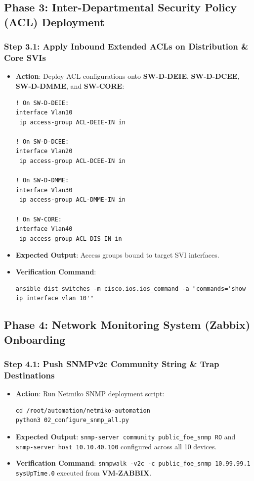 \documentclass[11pt,a4paper]{article}
\newcommand{\hr}{\vspace{0.2cm}\noindent\hrulefill\vspace{0.2cm}}
\begin{document}
\subsection{Phase 3: Inter-Departmental Security Policy (ACL) Deployment}

\subsubsection{Step 3.1: Apply Inbound Extended ACLs on Distribution \& Core SVIs}
\begin{itemize}
    \item \textbf{Action}: Deploy ACL configurations onto \textbf{SW-D-DEIE}, \textbf{SW-D-DCEE}, \textbf{SW-D-DMME}, and \textbf{SW-CORE}:
\begin{lstlisting}[style=ciscostyle]
! On SW-D-DEIE:
interface Vlan10
 ip access-group ACL-DEIE-IN in

! On SW-D-DCEE:
interface Vlan20
 ip access-group ACL-DCEE-IN in

! On SW-D-DMME:
interface Vlan30
 ip access-group ACL-DMME-IN in

! On SW-CORE:
interface Vlan40
 ip access-group ACL-DIS-IN in
\end{lstlisting}
    \item \textbf{Expected Output}: Access groups bound to target SVI interfaces.
    \item \textbf{Verification Command}:
\begin{lstlisting}[style=bashstyle]
ansible dist_switches -m cisco.ios.ios_command -a "commands='show ip interface vlan 10'"
\end{lstlisting}
\end{itemize}

\hr

\subsection{Phase 4: Network Monitoring System (Zabbix) Onboarding}

\subsubsection{Step 4.1: Push SNMPv2c Community String \& Trap Destinations}
\begin{itemize}
    \item \textbf{Action}: Run Netmiko SNMP deployment script:
\begin{lstlisting}[style=bashstyle]
cd /root/automation/netmiko-automation
python3 02_configure_snmp_all.py
\end{lstlisting}
    \item \textbf{Expected Output}: \texttt{snmp-server community public\_foe\_snmp RO} and \texttt{snmp-server host 10.10.40.100} configured across all 10 devices.
    \item \textbf{Verification Command}: \texttt{snmpwalk -v2c -c public\_foe\_snmp 10.99.99.1 sysUpTime.0} executed from \textbf{VM-ZABBIX}.
\end{itemize}
\end{document}
